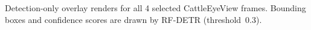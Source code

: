 \caption{Detection-only overlay renders for all 4 selected CattleEyeView frames. Bounding boxes and confidence scores are drawn by RF-DETR (threshold~0.3).}\label{fig:detection-gallery-cattleeyeview}
